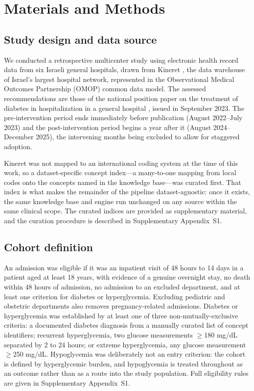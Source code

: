 \section{Materials and Methods}
\label{sec:methods}

\subsection{Study design and data source}

We conducted a retrospective multicenter study using electronic health record
data from six Israeli general hospitals, drawn from Kineret
\citep{rappoport2025kineret}, the data warehouse of Israel's largest hospital
network, represented in the Observational Medical Outcomes Partnership (OMOP)
common data model. The assessed recommendations are those of the national
position paper on the treatment of diabetes in hospitalization in a general
hospital \citep{hochberg2023inpatient}, issued in September 2023. The
pre-intervention period ends immediately before publication (August 2022--July
2023) and the post-intervention period begins a year after it (August
2024--December 2025), the intervening months being excluded to allow for
staggered adoption.

Kineret was not mapped to an international coding system at the time of this
work, so a dataset-specific concept index---a many-to-one mapping from local
codes onto the concepts named in the knowledge base---was curated first. That
index is what makes the remainder of the pipeline dataset-agnostic: once it
exists, the same knowledge base and engine run unchanged on any source within
the same clinical scope. The curated indices are provided as supplementary
material, and the curation procedure is described in Supplementary
Appendix~S1.

\subsection{Cohort definition}
\label{sec:cohort-definition}

An admission was eligible if it was an inpatient visit of 48 hours to 14 days
in a patient aged at least 18 years, with evidence of a genuine overnight stay,
no death within 48 hours of admission, no admission to an excluded department,
and at least one criterion for diabetes or hyperglycemia. Excluding pediatric
and obstetric departments also removes pregnancy-related admissions. Diabetes or
hyperglycemia was established by at least one of three non-mutually-exclusive
criteria: a documented diabetes
diagnosis from a manually curated list of concept identifiers; recurrent
hyperglycemia, two glucose measurements $\geq$180 mg/dL separated by 2 to 24
hours; or extreme hyperglycemia, any glucose measurement $\geq$250 mg/dL.
Hypoglycemia was deliberately not an entry criterion: the cohort is defined by
hyperglycemic burden, and hypoglycemia is treated throughout as an outcome
rather than as a route into the study population. Full eligibility rules are
given in Supplementary Appendix~S1.

